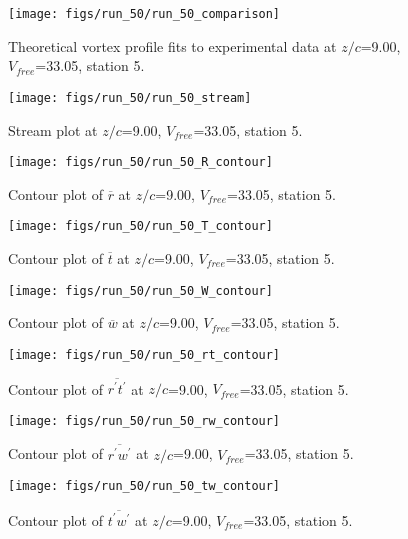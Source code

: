 \begin{figure}[H]
\centering
\texttt{[image: figs/run\_50/run\_50\_comparison]}
\caption{Theoretical vortex profile fits to experimental data at $z/c$=9.00, $V_{free}$=33.05, station 5.}
\label{fig:run_50_comparison}
\end{figure}


\begin{figure}[H]
\centering
\texttt{[image: figs/run\_50/run\_50\_stream]}
\caption{Stream plot at $z/c$=9.00, $V_{free}$=33.05, station 5.}
\label{fig:run_50_stream}
\end{figure}


\begin{figure}[H]
\centering
\texttt{[image: figs/run\_50/run\_50\_R\_contour]}
\caption{Contour plot of $\overline{r}$ at $z/c$=9.00, $V_{free}$=33.05, station 5.}
\label{fig:run_50_R_contour}
\end{figure}


\begin{figure}[H]
\centering
\texttt{[image: figs/run\_50/run\_50\_T\_contour]}
\caption{Contour plot of $\overline{t}$ at $z/c$=9.00, $V_{free}$=33.05, station 5.}
\label{fig:run_50_T_contour}
\end{figure}


\begin{figure}[H]
\centering
\texttt{[image: figs/run\_50/run\_50\_W\_contour]}
\caption{Contour plot of $\overline{w}$ at $z/c$=9.00, $V_{free}$=33.05, station 5.}
\label{fig:run_50_W_contour}
\end{figure}


\begin{figure}[H]
\centering
\texttt{[image: figs/run\_50/run\_50\_rt\_contour]}
\caption{Contour plot of $\overline{r^\prime t^\prime}$ at $z/c$=9.00, $V_{free}$=33.05, station 5.}
\label{fig:run_50_rt_contour}
\end{figure}


\begin{figure}[H]
\centering
\texttt{[image: figs/run\_50/run\_50\_rw\_contour]}
\caption{Contour plot of $\overline{r^\prime w^\prime}$ at $z/c$=9.00, $V_{free}$=33.05, station 5.}
\label{fig:run_50_rw_contour}
\end{figure}


\begin{figure}[H]
\centering
\texttt{[image: figs/run\_50/run\_50\_tw\_contour]}
\caption{Contour plot of $\overline{t^\prime w^\prime}$ at $z/c$=9.00, $V_{free}$=33.05, station 5.}
\label{fig:run_50_tw_contour}
\end{figure}


